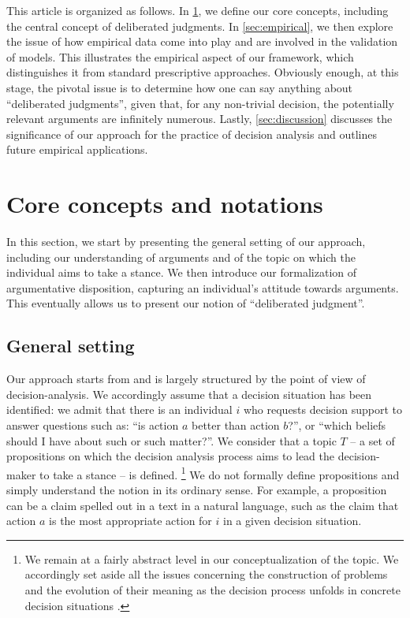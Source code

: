 \documentclass[smallextended,nospthms, natbib]{svjour3}
\begin{document}
This article is organized as follows. In \cref{sec:core}, we define our core concepts, including the central concept of deliberated judgments. In \cref{sec:empirical}, we then explore the issue of how empirical data come into play and are involved in the validation of models. This illustrates the empirical aspect of our framework, which distinguishes it from standard prescriptive approaches. Obviously enough, at this stage, the pivotal issue is to determine how one can say anything about “deliberated judgments”, given that, for any non-trivial decision, the potentially relevant arguments are infinitely numerous. Lastly, \cref{sec:discussion} discusses the significance of our approach for the practice of decision analysis and outlines future empirical applications. 

\section{Core concepts and notations}
\label{sec:core}

In this section, we start by presenting the general setting of our approach, including our understanding of arguments and of the topic on which the individual aims to take a stance. We then introduce our formalization of argumentative disposition, capturing an individual's attitude towards arguments. This eventually allows us to present our notion of “deliberated judgment”.

\subsection{General setting}
Our approach starts from and is largely structured by the point of view of decision-analysis. We accordingly assume that a decision situation has been identified: we admit that there is an individual $i$ who requests decision support to answer questions such as: “is action $a$ better than action $b$?”, or “which beliefs should I have about such or such matter?”. We consider that a topic $T$ -- a set of propositions on which the decision analysis process aims to lead the decision-maker to take a stance -- is defined.%
\footnote{We remain at a fairly abstract level in our conceptualization of the topic. We accordingly set aside all the issues concerning the construction of problems and the evolution of their meaning as the decision process unfolds in concrete decision situations \citep{rosenhead_rational_2001}.}
We do not formally define propositions and simply understand the notion in its ordinary sense. For example, a proposition can be a claim spelled out in a text in a natural language, such as the claim that action $a$ is the most appropriate action for $i$ in a given decision situation.
\end{document}
